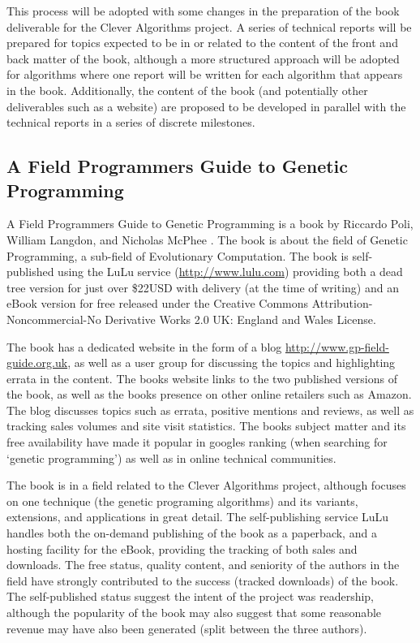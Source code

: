 \documentclass[a4paper, 11pt]{article}
\begin{document}
This process will be adopted with some changes in the preparation of the book deliverable for the Clever Algorithms project. A series of technical reports will be prepared for topics expected to be in or related to the content of the front and back matter of the book, although a more structured approach will be adopted for algorithms where one report will be written for each algorithm that appears in the book. Additionally, the content of the book (and potentially other deliverables such as a website) are proposed to be developed in parallel with the technical reports in a series of discrete milestones. 
 

% 
% 
\subsection{A Field Programmers Guide to Genetic Programming}
A Field Programmers Guide to Genetic Programming is a book by Riccardo Poli, William Langdon, and Nicholas McPhee \cite{Poli2008}. The book is about the field of Genetic Programming, a sub-field of Evolutionary Computation. The book is self-published using the LuLu service (\url{http://www.lulu.com}) providing both a dead tree version for just over \$22USD with delivery (at the time of writing) and an eBook version for free released under the Creative Commons Attribution-Noncommercial-No Derivative Works 2.0 UK: England and Wales License.

The book has a dedicated website in the form of a blog \url{http://www.gp-field-guide.org.uk}, as well as a user group for discussing the topics and highlighting errata in the content. The books website links to the two published versions of the book, as well as the books presence on other online retailers such as Amazon. The blog discusses topics such as errata, positive mentions and reviews, as well as tracking sales volumes and site visit statistics. The books subject matter and its free availability have made it popular in googles ranking (when searching for `genetic programming') as well as in online technical communities. 

The book is in a field related to the Clever Algorithms project, although focuses on one technique (the genetic programing algorithms) and its variants, extensions, and applications in great detail. The self-publishing service LuLu handles both the on-demand publishing of the book as a paperback, and a hosting facility for the eBook, providing the tracking of both sales and downloads. The free status, quality content, and seniority of the authors in the field have strongly contributed to the success (tracked downloads) of the book. The self-published status suggest the intent of the project was readership, although the popularity of the book may also suggest that some reasonable revenue may have also been generated (split between the three authors). 
\end{document}
